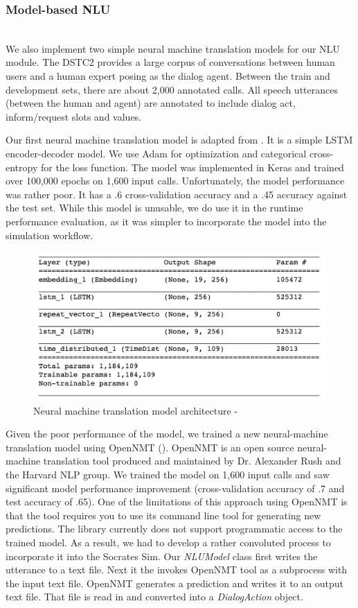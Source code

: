 \subsubsection{Model-based NLU}
~ \\
We also implement two simple neural machine translation models for our NLU module. The DSTC2 provides a large corpus of conversations between human users and a human expert posing as the dialog agent. Between the train and development sets, there are about 2,000 annotated calls. All speech utterances (between the human and agent) are annotated to include dialog act, inform/request slots and values.

Our first neural machine translation model is adapted from \cite{brownlee_2017}. It is a simple LSTM encoder-decoder model. We use Adam for optimization and categorical cross-entropy for the loss function. The model was implemented in Keras and trained over 100,000 epochs on 1,600 input calls. Unfortunately, the model performance was rather poor. It has a .6 cross-validation accuracy and a .45 accuracy against the test set. While this model is unusable, we do use it in the runtime performance evaluation, as it was simpler to incorporate the model into the simulation workflow. 

\begin{figure}[h!]
	\centering
	\includegraphics[scale=.25]{diagrams/simple_nmt.jpeg}
	\caption{ Neural machine translation model architecture  - \cite{brownlee_2017} }
	\label{fig:simple_nmt_model}
\end{figure}

Given the poor performance of the \cite{brownlee_2017} model, we trained a new neural-machine translation model using OpenNMT (\cite{2017opennmt}). OpenNMT is an open source neural-machine translation tool produced and maintained by Dr. Alexander Rush and the Harvard NLP group. We trained the model on 1,600 input calls and saw significant model performance improvement (cross-validation accuracy of .7 and test accuracy of .65). One of the limitations of this approach using OpenNMT is that the tool requires you to use its command line tool for generating new predictions. The library currently does not support programmatic access to the trained model. As a result, we had to develop a rather convoluted process to incorporate it into the Socrates Sim. Our \textit{NLUModel} class first writes the utterance to a text file. Next it the invokes OpenNMT tool as a subprocess with the input text file. OpenNMT generates a prediction and writes it to an output text file. That file is read in and converted into a \textit{DialogAction} object. 

